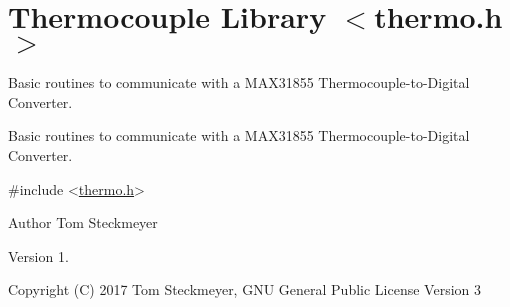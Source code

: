 \hypertarget{group__tstec__thermo}{}\section{Thermocouple Library $<$thermo.\+h$>$}
\label{group__tstec__thermo}


Basic routines to communicate with a M\+A\+X31855 Thermocouple-\/to-\/\+Digital Converter.  


Basic routines to communicate with a M\+A\+X31855 Thermocouple-\/to-\/\+Digital Converter. 


\begin{DoxyCode}
\textcolor{preprocessor}{#include <\hyperlink{thermo_8h}{thermo.h}>} 
\end{DoxyCode}


\begin{DoxyAuthor}{Author}
Tom Steckmeyer
\end{DoxyAuthor}
\begin{DoxyVersion}{Version}
1.
\end{DoxyVersion}
\begin{DoxyCopyright}{Copyright}
(C) 2017 Tom Steckmeyer, G\+NU General Public License Version 3 
\end{DoxyCopyright}
